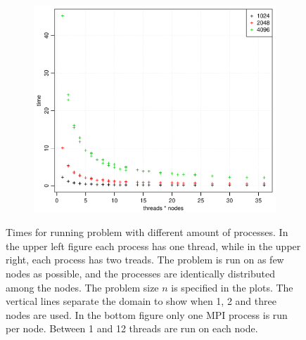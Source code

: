 \begin{figure}[h!]
\begin{subfigure}[b]{0.48\textwidth}
  \end{subfigure}
  \quad
  \begin{subfigure}[b]{0.48\textwidth}
    \includegraphics[width=\textwidth]{./Figures/taskbTimeNodesTimesThreads.pdf}
    \caption{}
    \label{fig:time3}
  \end{subfigure}
  \vspace{1\baselineskip}
  \caption{Times for running problem with different amount of processes. In the upper left figure each process has one thread, while in the upper right, each process has two treads. The problem is run on as few nodes as possible, and the processes are identically distributed among the nodes. The problem size $n$ is specified in the plots. The vertical lines separate the domain to show when 1, 2 and three nodes are used. In the bottom figure only one MPI process is run per node. Between 1 and 12 threads are run on each node.}
  \label{fig:time}
\end{figure}
%
